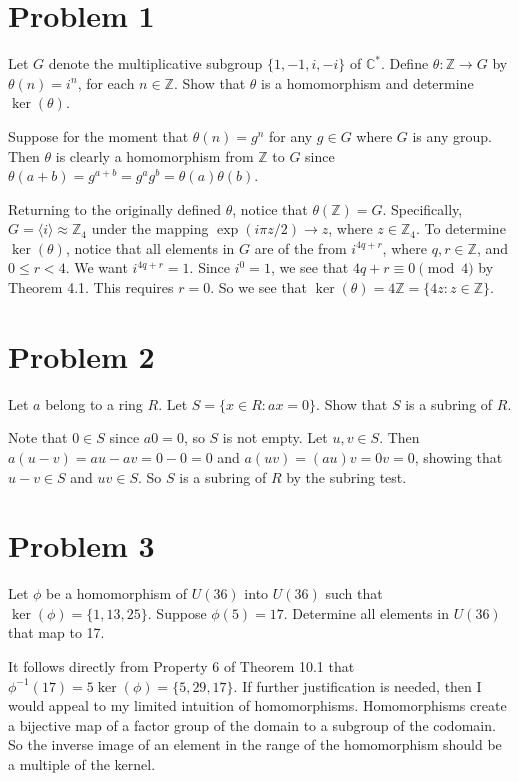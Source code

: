 \documentclass{article}
\begin{document}
\newcommand{\C}{\mathbb{C}}
\newcommand{\R}{\mathbb{R}}
\newcommand{\Q}{\mathbb{Q}}
\newcommand{\Z}{\mathbb{Z}}
\newcommand{\N}{\mathbb{N}}

\section*{Problem 1}

Let $G$ denote the multiplicative subgroup
$\{1,-1,i,-i\}$ of $\C^*$.  Define $\theta:\Z\to G$
by $\theta(n)=i^n$, for each $n\in\Z$.
Show that $\theta$ is a homomorphism and determine $\ker(\theta)$.

Suppose for the moment that $\theta(n)=g^n$ for any $g\in G$
where $G$ is any group.  Then $\theta$ is clearly a homomorphism
from $\Z$ to $G$ since $\theta(a+b)=g^{a+b}=g^ag^b=\theta(a)\theta(b)$.

Returning to the originally defined $\theta$,
notice that $\theta(\Z)=G$.
Specifically, $G=\langle i\rangle\approx\Z_4$ under the
mapping $\exp(i\pi z/2)\to z$, where $z\in\Z_4$.
To determine $\ker(\theta)$, notice that all elements in
$G$ are of the from $i^{4q+r}$, where $q,r\in\Z$, and $0\leq r< 4$.
We want $i^{4q+r}=1$.  Since $i^0=1$, we see that
$4q+r\equiv 0\pmod{4}$ by Theorem 4.1.
This requires $r=0$.  So we see that $\ker(\theta)=4\Z=\{4z:z\in\Z\}$.

\section*{Problem 2}

Let $a$ belong to a ring $R$.  Let $S=\{x\in R:ax=0\}$.
Show that $S$ is a subring of $R$.

Note that $0\in S$ since $a0=0$, so $S$ is not empty.
Let $u,v\in S$.  Then $a(u-v)=au-av=0-0=0$ and $a(uv)=(au)v=0v=0$,
showing that $u-v\in S$ and $uv\in S$.  So $S$ is a subring of
$R$ by the subring test.

\section*{Problem 3}

Let $\phi$ be a homomorphism of $U(36)$ into $U(36)$ such that
$\ker(\phi)=\{1,13,25\}$.  Suppose $\phi(5)=17$.
Determine all elements in $U(36)$ that map to 17.

It follows directly from Property 6 of Theorem 10.1 that
$\phi^{-1}(17)=5\ker(\phi)=\{5,29,17\}$.  If further justification is
needed, then I would appeal to my limited intuition of homomorphisms.
Homomorphisms create a bijective map of a factor group of the domain to
a subgroup of the codomain.  So the inverse image of an element in the range
of the homomorphism should be a multiple of the kernel.
\end{document}
